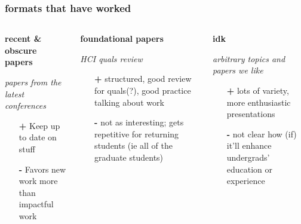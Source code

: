 \documentclass[aspectratio=169,10pt]{beamer} %
\begin{document}
\begin{frame}[t]\frametitle{formats that have worked}

\begin{columns}[t]

\begin{column}{.33\linewidth}
\begin{center}
\textbf{\large recent \& obscure papers}
\end{center}

\textit{\small papers from the latest conferences}

\begin{itemize}
\item[\alert{\textbf{\large +}}] Keep up to date on stuff
\item[\alert{\textbf{\large -}}] Favors new work more than impactful work
\end{itemize}
\end{column}


\begin{column}{.33\linewidth}
\begin{center}
\textbf{\large foundational papers}
\end{center}
\textit{\small HCI quals review}

\begin{itemize}
\item[\alert{\textbf{\large +}}] structured, good review for quals(?), good practice talking about work
\item[\alert{\textbf{\large -}}] not as interesting; gets repetitive for returning students (ie all of the graduate students)
\end{itemize}
\end{column}


\begin{column}{.33\linewidth}
\begin{center}
\textbf{\large idk}
\end{center}
\textit{\small arbitrary topics and papers we like}

\begin{itemize}
\item[\alert{\textbf{\large +}}] lots of variety, more enthusiastic presentations
\item[\alert{\textbf{\large -}}] not clear how (if) it'll enhance undergrads' education or experience
\end{itemize}

\end{column}

\end{columns}

\end{frame}
\end{document}
